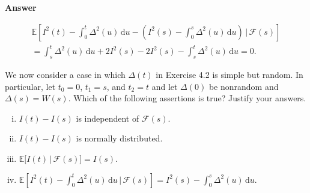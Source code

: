 \documentclass[11pt]{article}
\newcommand\E{\mathbb{E}}
\newcommand\cF{\mathcal{F}}
\newcounter{question}[section]
\newenvironment{hwanswer}
    {
        \vspace{2mm}
        {\bfseries Answer}
        \vspace{-\abovedisplayskip}
        \begin{center}
            \begin{tcolorbox}[
                width=0.95\textwidth,
                colback=white,
                colframe=white,
                opacityback=0,
                opacityframe=0,
                boxrule=0pt,
                frame hidden,
                breakable,
                before upper={\parindent15pt} %
            ]
            \lineskip=0pt %
    }
    {
        \end{tcolorbox}
        \end{center}
        \vspace{4mm}
    }
\begin{document}
\begin{hwanswer}
\begin{enumerate}[(i)]
\[\begin{multlined}
                    \E\left[
                        I^2(t) - \int_{0}^{t} \Delta^2(u) \, \text{d} u
                        -
                        \left(
                            I^2(s) - \int_{0}^{s} \Delta^2(u) \, \text{d} u
                        \right)
                        \, \bigg| \,
                        \cF(s)
                    \right]
                    \\
                    =
                    \int_{s}^{t}
                    \Delta^2(u) \, \text{d} u
                    + 2 I^2(s)
                    - 2 I^2(s)
                    -
                    \int_{s}^{t}
                    \Delta^2(u) \, \text{d} u
                    =
                    0.
                \end{multlined}
            \]
        \end{enumerate}
    \end{hwanswer}


    


    \begin{hwquestion}
        We now consider a case in which $\Delta(t)$ in Exercise 4.2 is simple but random. In
        particular, let $t_0 = 0$, $t_1 = s$, and $t_2 = t$ and let $\Delta(0)$ be nonrandom
        and $\Delta(s) = W(s)$. Which of the following assertions is true? Justify your
        answers.

        \vspace{2mm}

        \begin{enumerate}[(i), nolistsep]
            \item $I(t) - I(s)$ is independent of $\cF(s)$.
            \item $I(t) - I(s)$ is normally distributed.
            \item $\E\big[ I(t) \, | \, \cF(s) \big]= I(s)$.
            \item $\E\left[ I^2(t) - \int_{0}^{t} \Delta^2(u) \, \text{d} u \, | \, \cF(s)
            \right] = I^2(s) - \int_{0}^{s} \Delta^2(u) \, \text{d} u$.
        \end{enumerate}
    \end{hwquestion}
\end{document}

